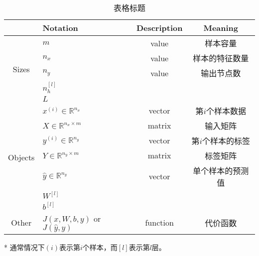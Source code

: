 	\begin{table}[h]
		\centering
		\begin{threeparttable}
		\caption{表格标题}
		\begin{tabular}{clcc}
			\hline
									 & \textbf{Notation}                   & \textbf{Description} & Meaning    \\ \hline
			\multirow{5}{*}{Sizes}   & $m$                                 & value                & 样本容量       \\
									 & $n_x$                               & value                & 样本的特征数量    \\
									 & $n_y$                               & value                & 输出节点数      \\
									 & $n_h^{[l]}$                         &                      &            \\
									 & $L$                                 &                      &            \\ \hline
			\multirow{7}{*}{Objects} & $x^{(i)} \in \mathbb{R}^{n_x}$      & vector               & 第$i$个样本数据  \\
									 & $X \in {\mathbb{R}^{n_x \times m}}$ & matrix               & 输入矩阵       \\
									 & $y^{(i)} \in \mathbb{R}^{n_y}$      & vector               & 第$i$个样本的标签 \\
									 & $Y \in {\mathbb{R}^{n_y \times m}}$ & matrix               & 标签矩阵       \\
									 & $\hat{y} \in \mathbb{R}^{n_y}$      & vector               & 单个样本的预测值   \\
									 & $W^{[l]}$                           &                      &            \\
									 & $b^{[l]}$                           &                      &            \\ \hline
			Other                    & $J(x,W,b,y)$ or $J(\hat{y},y)$      & function             & 代价函数       \\ \hline
		\end{tabular}
		\label{Standard notations} %
    	\begin{tablenotes}
      		\item[*] 通常情况下$(i)$表示第$i$个样本，而$[l]$表示第$l$层。
    	\end{tablenotes}
		\end{threeparttable}
	\end{table}


